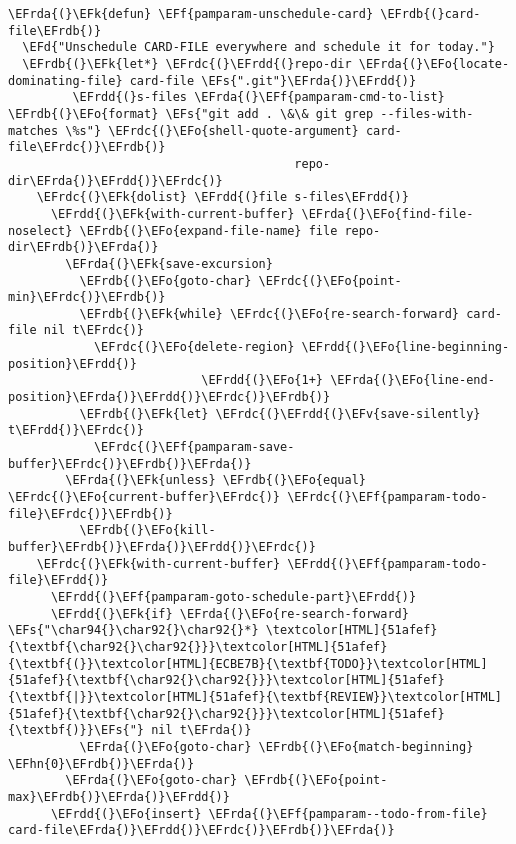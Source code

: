 \documentclass[a4wide,10pt]{article}
\newcommand{\EFs}[1]{\textcolor{EFs}{#1}} %
\newcommand{\EFd}[1]{\textcolor{EFd}{#1}} %
\newcommand{\EFk}[1]{\textcolor{EFk}{#1}} %
\newcommand{\EFf}[1]{\textcolor{EFf}{#1}} %
\newcommand{\EFv}[1]{\textcolor{EFv}{#1}} %
\newcommand{\EFo}[1]{\textcolor{EFo}{#1}} %
\newcommand{\EFhn}[1]{\textcolor{EFhn}{\textbf{#1}}} %
\newcommand{\EFrda}[1]{\textcolor{EFrda}{#1}} %
\newcommand{\EFrdb}[1]{\textcolor{EFrdb}{#1}} %
\newcommand{\EFrdc}[1]{\textcolor{EFrdc}{#1}} %
\newcommand{\EFrdd}[1]{\textcolor{EFrdd}{#1}} %
\begin{document}
\begin{Code}
\begin{Verbatim}
\EFrda{(}\EFk{defun} \EFf{pamparam-unschedule-card} \EFrdb{(}card-file\EFrdb{)}
  \EFd{"Unschedule CARD-FILE everywhere and schedule it for today."}
  \EFrdb{(}\EFk{let*} \EFrdc{(}\EFrdd{(}repo-dir \EFrda{(}\EFo{locate-dominating-file} card-file \EFs{".git"}\EFrda{)}\EFrdd{)}
         \EFrdd{(}s-files \EFrda{(}\EFf{pamparam-cmd-to-list} \EFrdb{(}\EFo{format} \EFs{"git add . \&\& git grep --files-with-matches \%s"} \EFrdc{(}\EFo{shell-quote-argument} card-file\EFrdc{)}\EFrdb{)}
                                        repo-dir\EFrda{)}\EFrdd{)}\EFrdc{)}
    \EFrdc{(}\EFk{dolist} \EFrdd{(}file s-files\EFrdd{)}
      \EFrdd{(}\EFk{with-current-buffer} \EFrda{(}\EFo{find-file-noselect} \EFrdb{(}\EFo{expand-file-name} file repo-dir\EFrdb{)}\EFrda{)}
        \EFrda{(}\EFk{save-excursion}
          \EFrdb{(}\EFo{goto-char} \EFrdc{(}\EFo{point-min}\EFrdc{)}\EFrdb{)}
          \EFrdb{(}\EFk{while} \EFrdc{(}\EFo{re-search-forward} card-file nil t\EFrdc{)}
            \EFrdc{(}\EFo{delete-region} \EFrdd{(}\EFo{line-beginning-position}\EFrdd{)}
                           \EFrdd{(}\EFo{1+} \EFrda{(}\EFo{line-end-position}\EFrda{)}\EFrdd{)}\EFrdc{)}\EFrdb{)}
          \EFrdb{(}\EFk{let} \EFrdc{(}\EFrdd{(}\EFv{save-silently} t\EFrdd{)}\EFrdc{)}
            \EFrdc{(}\EFf{pamparam-save-buffer}\EFrdc{)}\EFrdb{)}\EFrda{)}
        \EFrda{(}\EFk{unless} \EFrdb{(}\EFo{equal} \EFrdc{(}\EFo{current-buffer}\EFrdc{)} \EFrdc{(}\EFf{pamparam-todo-file}\EFrdc{)}\EFrdb{)}
          \EFrdb{(}\EFo{kill-buffer}\EFrdb{)}\EFrda{)}\EFrdd{)}\EFrdc{)}
    \EFrdc{(}\EFk{with-current-buffer} \EFrdd{(}\EFf{pamparam-todo-file}\EFrdd{)}
      \EFrdd{(}\EFf{pamparam-goto-schedule-part}\EFrdd{)}
      \EFrdd{(}\EFk{if} \EFrda{(}\EFo{re-search-forward} \EFs{"\char94{}\char92{}\char92{}*} \textcolor[HTML]{51afef}{\textbf{\char92{}\char92{}}}\textcolor[HTML]{51afef}{\textbf{(}}\textcolor[HTML]{ECBE7B}{\textbf{TODO}}\textcolor[HTML]{51afef}{\textbf{\char92{}\char92{}}}\textcolor[HTML]{51afef}{\textbf{|}}\textcolor[HTML]{51afef}{\textbf{REVIEW}}\textcolor[HTML]{51afef}{\textbf{\char92{}\char92{}}}\textcolor[HTML]{51afef}{\textbf{)}}\EFs{"} nil t\EFrda{)}
          \EFrda{(}\EFo{goto-char} \EFrdb{(}\EFo{match-beginning} \EFhn{0}\EFrdb{)}\EFrda{)}
        \EFrda{(}\EFo{goto-char} \EFrdb{(}\EFo{point-max}\EFrdb{)}\EFrda{)}\EFrdd{)}
      \EFrdd{(}\EFo{insert} \EFrda{(}\EFf{pamparam--todo-from-file} card-file\EFrda{)}\EFrdd{)}\EFrdc{)}\EFrdb{)}\EFrda{)}


\end{Verbatim}
\end{Code}
\end{document}
